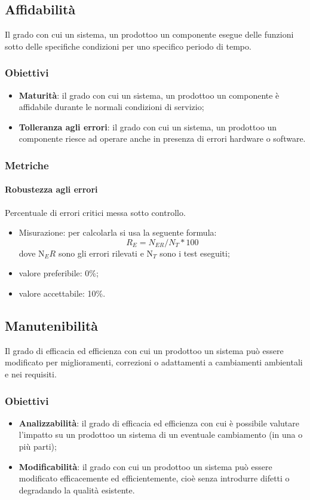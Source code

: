     \subsection{Affidabilità}
        Il grado con cui un sistema, un prodotto\glosp o un componente esegue delle funzioni sotto delle specifiche condizioni per uno specifico periodo di tempo.
        \subsubsection{Obiettivi}
            \begin{itemize}
                \item \textbf{Maturità}: il grado con cui un sistema, un prodotto\glosp o un componente è affidabile durante le normali condizioni di servizio;
                \item \textbf{Tolleranza agli errori}: il grado con cui un sistema, un prodotto\glosp o un componente riesce ad operare anche in presenza di errori hardware o software.
            \end{itemize}
        \subsubsection{Metriche}
            \paragraph{Robustezza agli errori}
                Percentuale di errori critici messa sotto controllo.
                \begin{itemize}
                    \item Misurazione: per calcolarla si usa la seguente formula:
                    \[R_E=N_{ER}/N_{T}*100\]
                    dove N$_ER$ sono gli errori rilevati e N$_T$ sono i test eseguiti;
                    \item valore preferibile: 0\%;
                    \item valore accettabile: 10\%.
                \end{itemize}
    \subsection{Manutenibilità}
        Il grado di efficacia ed efficienza con cui un prodotto\glosp o un sistema può essere modificato per miglioramenti, correzioni o adattamenti a cambiamenti ambientali e nei requisiti.
        \subsubsection{Obiettivi}
        \begin{itemize}
            \item \textbf{Analizzabilità}: il grado di efficacia ed efficienza con cui è possibile valutare l'impatto su un prodotto\glosp o un sistema di un eventuale cambiamento (in una o più parti);
            \item \textbf{Modificabilità}: il grado con cui un prodotto\glosp o un sistema può essere modificato efficacemente ed efficientemente, cioè senza introdurre difetti o degradando la qualità esistente.
        \end{itemize}
